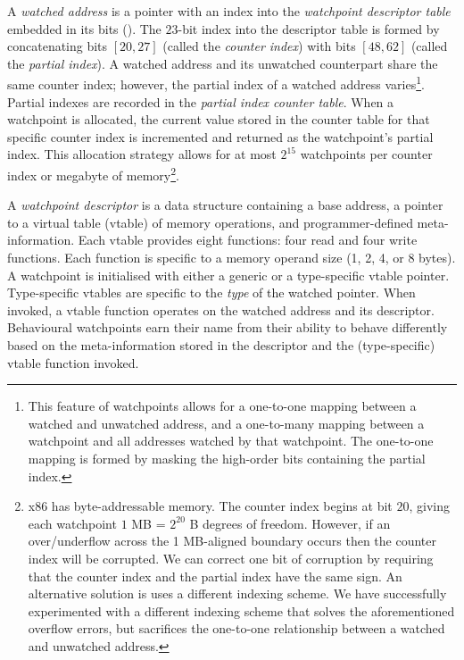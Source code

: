 \documentclass[letterpaper,twocolumn,10pt]{article}
\begin{document}
A \emph{watched address} is a pointer with an index into the \emph{watchpoint descriptor table} embedded in its bits (). The $23$-bit index into the descriptor table is formed by concatenating bits $[20,27]$ (called the \emph{counter index}) with bits $[48,62]$ (called the \emph{partial index}). A watched address and its unwatched counterpart share the same counter index; however, the partial index of a watched address varies\footnote{This feature of watchpoints allows for a one-to-one mapping between a watched and unwatched address, and a one-to-many mapping between a watchpoint and all addresses watched by that watchpoint. The one-to-one mapping is formed by masking the high-order bits containing the partial index.}. Partial indexes are recorded in the \emph{partial index counter table}. When a watchpoint is allocated, the current value stored in the counter table for that specific counter index is incremented and returned as the watchpoint's partial index. This allocation strategy allows for at most $2^{15}$ watchpoints per counter index or megabyte of memory\footnote{x86 has byte-addressable memory. The counter index begins at bit $20$, giving each watchpoint $1$ MB = $2^{20}$ B degrees of freedom. However, if an over/underflow across the 1 MB-aligned boundary occurs then the counter index will be corrupted. We can correct one bit of corruption by requiring that the counter index and the partial index have the same sign. An alternative solution is uses a different indexing scheme. We have successfully experimented with a different indexing scheme that solves the aforementioned overflow errors, but sacrifices the one-to-one relationship between a watched and unwatched address.}.




A \emph{watchpoint descriptor} is a data structure containing a base address, a pointer to a virtual table (vtable) of memory operations, and programmer-defined meta-information. Each vtable provides eight functions: four read and four write functions. Each function is specific to a memory operand size (1, 2, 4, or 8 bytes). A watchpoint is initialised with either a generic or a type-specific vtable pointer. Type-specific vtables are specific to the \emph{type} of the watched pointer. When invoked, a vtable function operates on the watched address and its descriptor. Behavioural watchpoints earn their name from their ability to behave differently based on the meta-information stored in the descriptor and the (type-specific) vtable function invoked.
\end{document}
